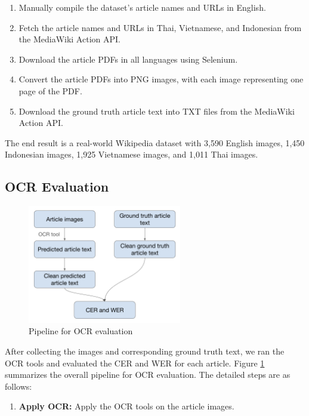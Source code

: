 \documentclass[12pt,oneside]{memoir}
\begin{document}
\begin{enumerate}
    \item Manually compile the dataset’s article names and URLs in English.
    \item Fetch the article names and URLs in Thai, Vietnamese, and Indonesian from the MediaWiki Action API.
    \item Download the article PDFs in all languages using Selenium.
    \item Convert the article PDFs into PNG images, with each image representing one page of the PDF.
    \item Download the ground truth article text into TXT files from the MediaWiki Action API.
\end{enumerate}

The end result is a real-world Wikipedia dataset with 3,590 English images, 1,450 Indonesian images, 1,925 Vietnamese images, and 1,011 Thai images.

\subsection{OCR Evaluation}

\begin{figure}[ht]
    \centering
    \includegraphics[width=0.6\textwidth]{images/ocr-evaluation.png}
    \caption{Pipeline for OCR evaluation}
    \label{figure:ocr-evaluation}
\end{figure}

After collecting the images and corresponding ground truth text, we ran the OCR tools and evaluated the CER and WER for each article.
Figure \ref{figure:ocr-evaluation} summarizes the overall pipeline for OCR evaluation. The detailed steps are as follows:

\begin{enumerate}
    \item \textbf{Apply OCR:} Apply the OCR tools on the article images.
\end{enumerate}
\end{document}

